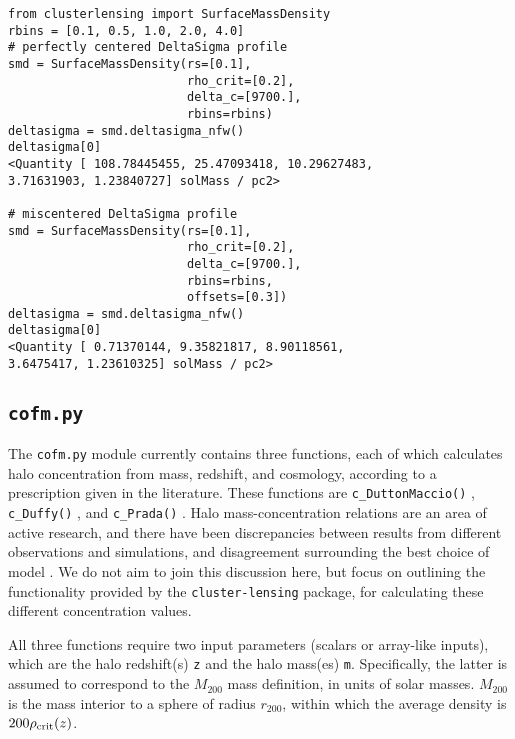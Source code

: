 \documentclass[twocolumn]{aastex6}
\newcommand{\code}{\lstinline[style=codeintext]}
\newcommand{\hcode}{\large\normalfont\texttt} %
\begin{document}
\begin{lstlisting}
from clusterlensing import SurfaceMassDensity
rbins = [0.1, 0.5, 1.0, 2.0, 4.0]
# perfectly centered DeltaSigma profile
smd = SurfaceMassDensity(rs=[0.1], 
                         rho_crit=[0.2], 
                         delta_c=[9700.], 
                         rbins=rbins)
deltasigma = smd.deltasigma_nfw()
deltasigma[0]
<Quantity [ 108.78445455, 25.47093418, 10.29627483, 
3.71631903, 1.23840727] solMass / pc2>

# miscentered DeltaSigma profile
smd = SurfaceMassDensity(rs=[0.1], 
                         rho_crit=[0.2], 
                         delta_c=[9700.], 
                         rbins=rbins,
                         offsets=[0.3])
deltasigma = smd.deltasigma_nfw()
deltasigma[0]
<Quantity [ 0.71370144, 9.35821817, 8.90118561, 
3.6475417, 1.23610325] solMass / pc2>
\end{lstlisting}


\subsection{\hcode{cofm.py}}
\label{cofm}

The \code{cofm.py} module currently contains three functions, each of which calculates halo concentration from mass, redshift, and cosmology, according to a prescription given in the literature. These functions are \code{c_DuttonMaccio()} \citep[for calculations following][]{Dutton14}, \code{c_Duffy()} \citep[following][]{Duffy08}, and \code{c_Prada()} \citep[for][]{Prada12}. Halo mass-concentration relations are an area of active research, and there have been discrepancies between results from different observations and simulations, and disagreement surrounding the best choice of model \citep[see e.g.][]{Dutton14, Klypin16}. We do not aim to join this discussion here, but focus on outlining the functionality provided by the \code{cluster-lensing} package, for calculating these different concentration values.

All three functions require two input parameters (scalars or array-like inputs), which are the halo redshift(s) \code{z} and the halo mass(es) \code{m}. Specifically, the latter is assumed to correspond to the $M_{200}$ mass definition, in units of solar masses. $M_{200}$ is the mass interior to a sphere of radius $r_{200}$, within which the average density is $200\rho_{\rm crit}(z)$. 
\end{document}

